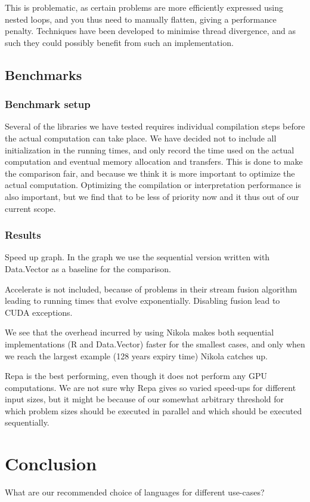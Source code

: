This is problematic, as certain problems are more efficiently
expressed using nested loops, and you thus need to manually flatten,
giving a performance penalty. Techniques have been developed to
minimise thread divergence, and as such they could possibly benefit
from such an implementation.


\section{Benchmarks}

\subsection{Benchmark setup}
Several of the libraries we have tested requires individual
compilation steps before the actual computation can take place. We
have decided not to include all initialization in the running times,
and only record the time used on the actual computation and eventual
memory allocation and transfers. This is done to make the comparison
fair, and because we think it is more important to optimize the actual
computation. Optimizing the compilation or interpretation performance
is also important, but we find that to be less of priority now and it
thus out of our current scope.

\subsection{Results}
Speed up graph. In the graph we use the sequential version written
with Data.Vector as a baseline for the comparison.

Accelerate is not included, because of problems in their stream fusion
algorithm leading to running times that evolve
exponentially. Disabling fusion lead to CUDA exceptions.

We see that the overhead incurred by using Nikola makes both
sequential implementations (R and Data.Vector) faster for the smallest
cases, and only when we reach the largest example (128 years expiry
time) Nikola catches up.

Repa is the best performing, even though it does not perform any GPU
computations. We are not sure why Repa gives so varied speed-ups for
different input sizes, but it might be because of our somewhat
arbitrary threshold for which problem sizes should be executed in
parallel and which should be executed sequentially.


\chapter{Conclusion}
What are our recommended choice of languages for different use-cases?


